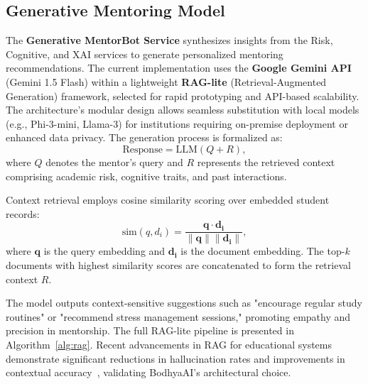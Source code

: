 \documentclass[conference]{IEEEtran}
\begin{document}
\subsection{Generative Mentoring Model}
The \textbf{Generative MentorBot Service} synthesizes insights from the Risk, Cognitive, and XAI services to generate personalized mentoring recommendations. The current implementation uses the \textbf{Google Gemini API} (Gemini 1.5 Flash) within a lightweight \textbf{RAG-lite} (Retrieval-Augmented Generation) framework, selected for rapid prototyping and API-based scalability. The architecture's modular design allows seamless substitution with local models (e.g., Phi-3-mini, Llama-3) for institutions requiring on-premise deployment or enhanced data privacy. The generation process is formalized as:
\begin{equation}
    \text{Response} = \text{LLM}(Q + R),
\end{equation}
where $Q$ denotes the mentor's query and $R$ represents the retrieved context comprising academic risk, cognitive traits, and past interactions.  

Context retrieval employs cosine similarity scoring over embedded student records:
\begin{equation}
    \text{sim}(q, d_i) = \frac{\mathbf{q} \cdot \mathbf{d_i}}{\|\mathbf{q}\| \|\mathbf{d_i}\|},
\end{equation}
where $\mathbf{q}$ is the query embedding and $\mathbf{d_i}$ is the document embedding. The top-$k$ documents with highest similarity scores are concatenated to form the retrieval context $R$.

The model outputs context-sensitive suggestions such as "encourage regular study routines" or "recommend stress management sessions," promoting empathy and precision in mentorship. The full RAG-lite pipeline is presented in Algorithm~\ref{alg:rag}. Recent advancements in RAG for educational systems demonstrate significant reductions in hallucination rates and improvements in contextual accuracy~\cite{ref38,ref39}, validating BodhyaAI's architectural choice.
\end{document}

